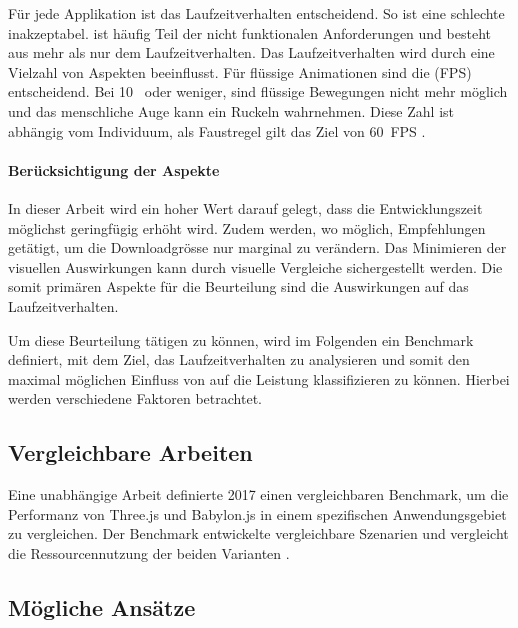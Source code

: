 Für jede Applikation ist das Laufzeitverhalten entscheidend. So ist eine schlechte  inakzeptabel.  ist häufig Teil der nicht funktionalen Anforderungen und besteht aus mehr als nur dem Laufzeitverhalten.
Das Laufzeitverhalten wird durch eine Vielzahl von Aspekten beeinflusst.
Für flüssige Animationen sind die  (FPS) entscheidend. Bei 10  oder weniger, sind flüssige Bewegungen nicht mehr möglich und das menschliche Auge kann ein Ruckeln wahrnehmen. Diese Zahl ist abhängig vom Individuum, als Faustregel gilt das Ziel von 60 \gls{FPS} \cite{limitsOfHumanVision}.

\paragraph{Berücksichtigung der Aspekte}
In dieser Arbeit wird ein hoher Wert darauf gelegt, dass die Entwicklungszeit möglichst geringfügig erhöht wird. Zudem werden, wo möglich, Empfehlungen getätigt, um die Downloadgrösse nur marginal zu verändern. Das Minimieren der visuellen Auswirkungen kann durch visuelle Vergleiche sichergestellt werden.
Die somit primären Aspekte für die Beurteilung sind die Auswirkungen auf das Laufzeitverhalten.

Um diese Beurteilung tätigen zu können, wird im Folgenden ein Benchmark definiert, mit dem Ziel, das Laufzeitverhalten zu analysieren und somit den maximal möglichen Einfluss von  auf die Leistung klassifizieren zu können. Hierbei werden verschiedene Faktoren betrachtet.

\subsection{Vergleichbare Arbeiten}
Eine unabhängige Arbeit definierte 2017 einen vergleichbaren Benchmark, um die Performanz von Three.js und Babylon.js in einem spezifischen Anwendungsgebiet zu vergleichen. Der Benchmark entwickelte vergleichbare Szenarien und vergleicht die Ressourcennutzung der beiden Varianten \cite{performanceComparisonBabylonThreejs}.

\subsection{Mögliche Ansätze}

